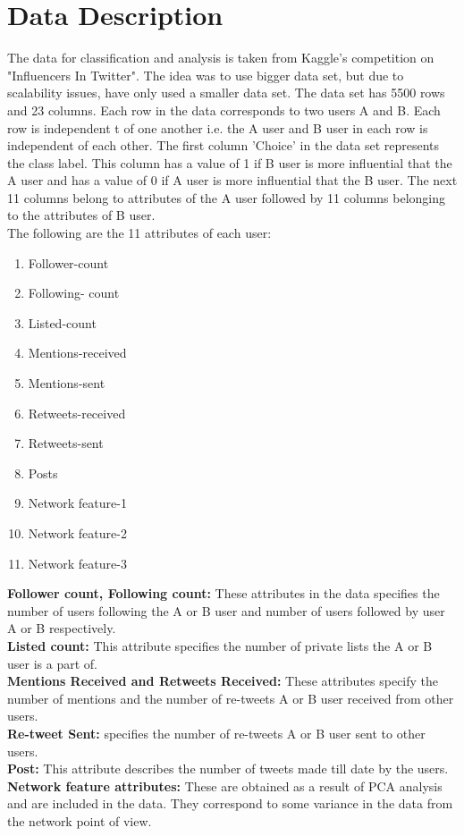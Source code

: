 \documentclass[sigconf]{acmart}
\begin{document}
\section{Data Description}
The data for classification and analysis is taken from Kaggle's competition on "Influencers In Twitter". The idea was to use bigger data set, but due to scalability issues, have only used a smaller data set. The data set has 5500 rows and 23 columns. Each row in the data corresponds to two users A and B. Each row is independent t of one another i.e. the A user and B user in each row is independent of each other. The first column 'Choice' in the data set represents the class label. This column has a value of 1 if B user is more influential that the A user and has a value of 0 if A user is more influential that the B user. The next 11 columns belong to attributes of the A user followed by 11 columns belonging to the attributes of B user.\\
The following are the 11 attributes of each user:\\
\begin{enumerate}

    \item Follower-count
    \item Following- count
    \item Listed-count
    \item Mentions-received
    \item Mentions-sent
    \item Retweets-received
    \item Retweets-sent
    \item Posts 
    \item Network feature-1
    \item Network feature-2
    \item Network feature-3 
    
\end{enumerate}
\textbf{Follower count, Following count:} These attributes in the data specifies the number of users following the A or B user and number of users followed by user A or B respectively. \\
\textbf{Listed count:} This attribute specifies the number of private lists the A or B user is a part of.\\
\textbf{Mentions Received and Retweets Received:} These attributes specify the number of mentions and the number of re-tweets A or B user received from other users.\\
\textbf{Re-tweet Sent:} specifies the number of re-tweets A or B user sent to other users.\\
\textbf{Post:} This attribute describes the number of tweets made till date by the users.\\
\textbf{Network feature attributes:} These are obtained as a result of PCA analysis and are included in the data. They correspond to some variance in the data from the network point of view.
\end{document}

